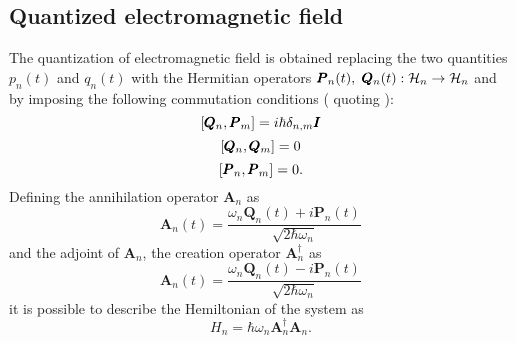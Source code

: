     \subsection{Quantized electromagnetic field}
        The quantization of electromagnetic field is obtained replacing the two quantities 
        $p_n(t)$ and $q_n(t)$ with the Hermitian operators 
        $\pmb{P}_n(t),\ \pmb{Q}_n(t):\Hilbert_n\to\Hilbert_n$ and by imposing the following
        commutation conditions (\cite{tesiGuerrini} quoting \cite{quantumRad_Louissel,quantumOptic_Mandel}):
        \begin{equation}
            \commutator{\pmb{Q}_n}{\pmb{P}_m}=i\hbar\delta_{n,m}\pmb{I}
        \end{equation}
        \begin{equation}
            \commutator{\pmb{Q}_n}{\pmb{Q}_m}=0
        \end{equation}
        \begin{equation}
            \commutator{\pmb{P}_n}{\pmb{P}_m}=0.
        \end{equation}
        Defining the annihilation operator $\pmb{A}_n$ as
        \begin{equation}
            \pmb{A}_n(t)=\frac{\omega_n\pmb{Q}_n(t)+i\pmb{P}_n(t)}{\sqrt{2\hbar\omega_n}}
            \label{eq:QEF.1}
        \end{equation} 
        and the adjoint of $\pmb{A}_n$, the creation operator $\pmb{A}_n^\dagger$ as
        \begin{equation}
            \pmb{A}_n(t)=\frac{\omega_n\pmb{Q}_n(t)-i\pmb{P}_n(t)}{\sqrt{2\hbar\omega_n}}
            \label{eq:QEF.2}
        \end{equation}
        it is possible to describe the Hemiltonian of the system as
        \begin{equation}
            H_n=\hbar\omega_n\pmb{A}_n^\dagger\pmb{A}_n.
            \label{eq:QEF.3}
        \end{equation}

